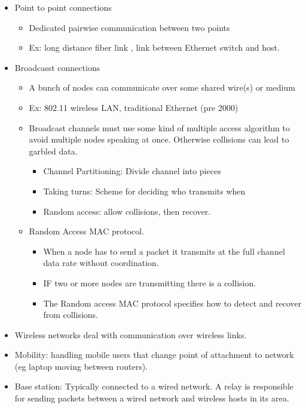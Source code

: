 \begin{itemize}
\tightlist
\item
  Point to point connections

  \begin{itemize}
  \tightlist
  \item
    Dedicated pairwise communication between two points
  \item
    Ex: long distance fiber link , link between Ethernet switch and
    host.
  \end{itemize}
\item
  Broadcasst connections

  \begin{itemize}
  \tightlist
  \item
    A bunch of nodes can communicate over some shared wire(s) or medium
  \item
    Ex: 802.11 wireless LAN, traditional Ethernet (pre 2000)
  \item
    Broadcast channels must use some kind of multiple access algorithm
    to avoid multiple nodes speaking at once. Otherwise collisions can
    lead to garbled data.

    \begin{itemize}
    \tightlist
    \item
      Channel Partitioning: Divide channel into pieces
    \item
      Taking turns: Scheme for deciding who transmits when
    \item
      Random access: allow collisions, then recover.
    \end{itemize}
  \item
    Random Access MAC protocol.

    \begin{itemize}
    \tightlist
    \item
      When a node has to send a packet it transmits at the full channel
      data rate without coordination.
    \item
      IF two or more nodes are transmitting there is a collision.
    \item
      The Random access MAC protocol specifies how to detect and recover
      from collisions.
    \end{itemize}
  \end{itemize}
\item
  Wireless networks deal with communication over wireless links.
\item
  Mobility: handling mobile users that change point of attachment to
  network (eg laptop moving between routers).
\item
  Base station: Typically connected to a wired network. A relay is
  responsible for sending packets between a wired network and wireless
  hosts in its area.


\end{itemize}
